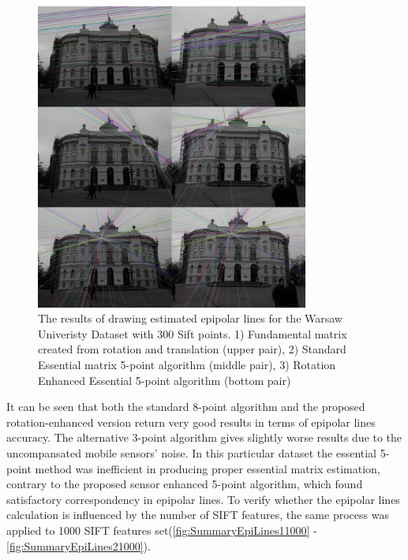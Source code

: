 \begin{figure}[ht!]
    \centering
    \includegraphics[width=0.8\textwidth]{summary2Sift300}
    \caption{The results of drawing estimated epipolar lines for the Warsaw Univeristy Dataset with 300 Sift points. 1) Fundamental matrix created from rotation and translation (upper pair), 2) Standard Essential matrix 5-point algorithm (middle pair), 3) Rotation Enhanced Essential 5-point algorithm (bottom pair) }
    \label{fig:SummaryEpiLines2300}
\end{figure}
It can be seen that both the standard 8-point algorithm and the proposed rotation-enhanced version return very good results in terms of epipolar lines accuracy. The alternative 3-point algorithm gives slightly worse results due to the uncompansated mobile sensors' noise. In this particular dataset the essential 5-point method was inefficient in producing proper essential matrix estimation, contrary to the proposed sensor enhanced 5-point algorithm, which found satisfactory correspondency in epipolar lines. \newline
To verify whether the epipolar lines calculation is influenced by the number of SIFT features, the same process was applied to 1000 SIFT features set(\ref{fig:SummaryEpiLines11000} - \ref{fig:SummaryEpiLines21000}). 
